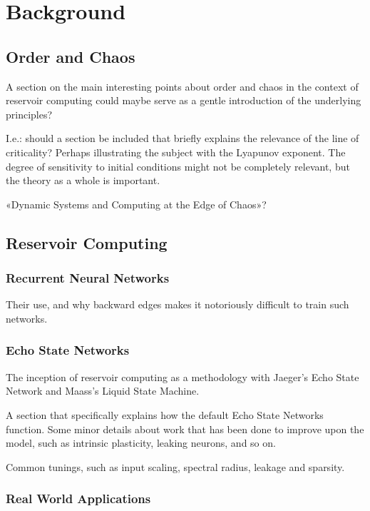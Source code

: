 \chapter{Background}

\section{Order and Chaos}

A section on the main interesting points about order and chaos in the context of
reservoir computing could maybe serve as a gentle introduction of the underlying
principles?

I.e.: should a section be included that briefly explains the relevance of the
line of criticality? Perhaps illustrating the subject with the Lyapunov
exponent. The degree of sensitivity to initial conditions might not be
completely relevant, but the theory as a whole is important.

«Dynamic Systems and Computing at the Edge of Chaos»?

\section{Reservoir Computing}

\subsection{Recurrent Neural Networks}

Their use, and why backward edges makes it notoriously difficult to train such
networks.

\subsection{Echo State Networks}

The inception of reservoir computing as a methodology with Jaeger's Echo State
Network and Maass's Liquid State Machine.

A section that specifically explains how the default Echo State Networks
function. Some minor details about work that has been done to improve upon the
model, such as intrinsic plasticity, leaking neurons, and so on.

Common tunings, such as input scaling, spectral radius, leakage and sparsity.

\subsection{Real World Applications}

